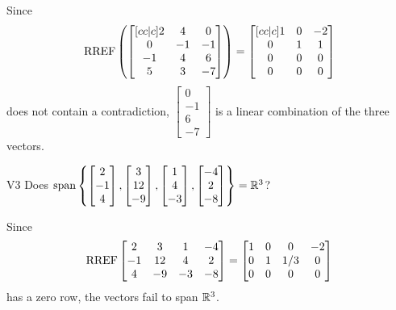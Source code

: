 \documentclass{sbgLAsemi}
\begin{document}
\begin{solution}
  Since
  \[
    \operatorname{RREF}\left(
      \begin{bmatrix}[cc|c]
        2 & 4 & 0 \\
        0 & -1 & -1 \\
        -1 & 4 & 6 \\
        5 & 3 & -7
      \end{bmatrix}
    \right) =
    \begin{bmatrix}[cc|c]
      1 & 0 & -2 \\
      0 & 1 & 1 \\
      0 & 0 & 0 \\
      0 & 0 & 0
    \end{bmatrix}
  \]
  does not contain a contradiction,
  \(\begin{bmatrix} 0 \\ -1 \\ 6 \\ -7 \end{bmatrix}\) is
  a linear combination of the three vectors.
\end{solution}


\begin{problem}{V3}
Does
\(
  \operatorname{span}\left\{
    \begin{bmatrix} 2 \\ -1 \\ 4 \end{bmatrix},
    \begin{bmatrix} 3 \\ 12 \\ -9 \end{bmatrix},
    \begin{bmatrix} 1 \\ 4 \\ -3 \end{bmatrix},
    \begin{bmatrix} -4 \\ 2 \\ -8 \end{bmatrix}
  \right\} = \mathbb{R}^3
\)?
\end{problem}
\begin{solution}
Since
\[
  \operatorname{RREF}\begin{bmatrix}
    2 & 3 & 1 & -4 \\
    -1 & 12 & 4 & 2 \\
    4 & -9 & -3 & -8
  \end{bmatrix} =
  \begin{bmatrix}
    1 & 0 & 0 & -2 \\
    0 & 1 & 1/3 & 0 \\
    0 & 0 & 0 & 0
  \end{bmatrix}
\]
has a zero row, the vectors fail to span \(\mathbb{R}^3\).
\end{solution}
\end{document}
